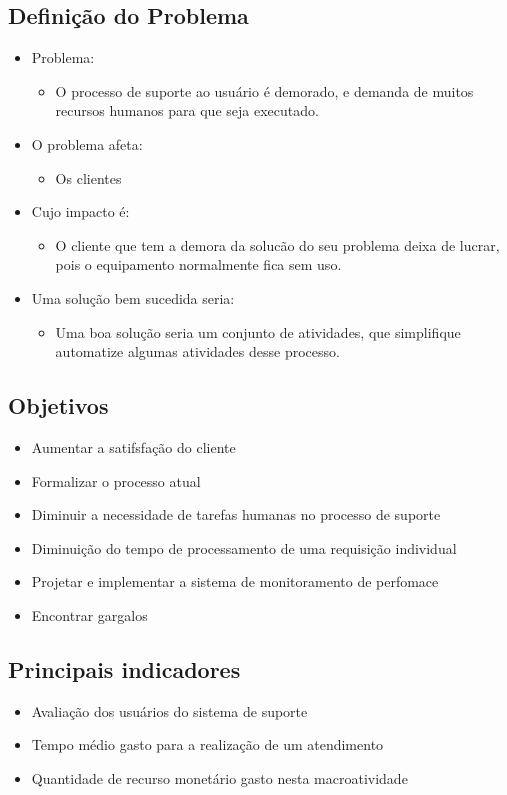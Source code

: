  \subsection{Definição do Problema}
 \begin{itemize}[noitemsep]
   \item Problema:
     \begin{itemize}
       \item O processo de suporte ao usuário é demorado, e demanda de muitos recursos
 						humanos para que seja executado.
     \end{itemize}
   \item O problema afeta:
     \begin{itemize}
       \item Os clientes
     \end{itemize}
   \item Cujo impacto é:
     \begin{itemize}
       \item	O cliente que tem a demora da solucão do seu problema
 						deixa de lucrar, pois o equipamento normalmente fica sem uso.
     \end{itemize}
   \item Uma solução bem sucedida seria:
		 \begin{itemize}
       \item Uma boa solução seria um conjunto de atividades, que simplifique
       	automatize algumas atividades desse processo.
			\end{itemize}
 \end{itemize}

\subsection{Objetivos}
\begin{itemize}[noitemsep]
	\item Aumentar a satifsfação do cliente
  \item Formalizar o processo atual
  \item Diminuir a necessidade de tarefas humanas no processo de suporte
  \item Diminuição do tempo de processamento de uma requisição individual
	\item Projetar e implementar a sistema de monitoramento de perfomace
  \item Encontrar gargalos
\end{itemize}

\subsection{Principais indicadores}
\begin{itemize}[noitemsep]
  \item Avaliação dos usuários do sistema de suporte
	\item Tempo médio gasto para a realização de um atendimento
	\item Quantidade de recurso monetário gasto nesta macroatividade
\end{itemize}

